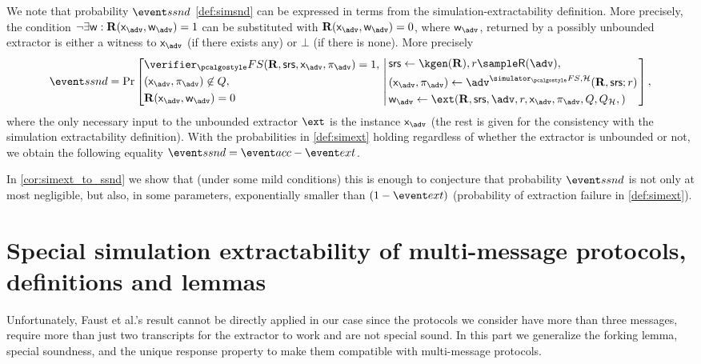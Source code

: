 \documentclass[runningheads,11pt]{llncs}
\begin{document}
\begin{remark}
  \label{rem:simext_to_simsnd}
  We note that probability $\ssndProb$ \cref{def:simsnd} can be expressed in
  terms from the simulation-extractability definition. More precisely, the
  condition $\neg \exists \wit: \REL(\inp_\adv, \wit_\adv) = 1$ can be substituted with
  $\REL(\inp_\adv, \wit_\adv) = 0$, where $\wit_\adv$, returned by a possibly unbounded
  extractor is either a witness to $\inp_\adv$ (if there exists any) or $\bot$ (if
  there is none). More precisely
\[
      \ssndProb =
      \Pr\left[
        \begin{aligned}
          & \verifier_\fs(\REL, \srs, \inp_{\adv}, \zkproof_{\adv}) = 1,\\
          & (\inp_{\advse}, \zkproof_{\advse}) \not\in Q,\\
          & \REL(\inp_{\adv}, \wit_{\adv}) = 0
        \end{aligned}
        \, \left| \,
      \begin{aligned}
        & \srs \gets \kgen(\REL), r \sample \RND{\advse},\\
        & (\inp_{\advse}, \zkproof_{\advse}) \gets \advse^{\simulator_\fs,
          \ro} (\REL, \srs; r)\\
        & \wit_{\adv} \gets \ext(\REL, \srs, \advse, r, \inp_{\advse}, \zkproof_{\advse},
			Q, Q_\ro,) 
      \end{aligned}
		\right.  \right],
\]
where the only necessary input to the unbounded extractor $\ext$ is the instance
$\inp_\adv$ (the rest is given for the consistency with the simulation extractability
definition). 
%
With the probabilities in \cref{def:simext} holding regardless of whether the extractor
is unbounded or not, we obtain the following equality
$ \ssndProb = \accProb - \extProb$.
\end{remark}

In \cref{cor:simext_to_ssnd} we show that (under some mild conditions) this is enough
to conjecture that probability $\ssndProb$ is not only at most negligible, but
also, in some parameters, exponentially smaller than $(1 - \extProb)$
(probability of extraction failure in \cref{def:simext}).

\section{Special simulation extractability of multi-message protocols,
  definitions and lemmas}
\label{sec:se_definitions}
Unfortunately, Faust et al.'s result cannot be directly applied in our case
since the protocols we consider have more than three messages, require more than
just two transcripts for the extractor to work and are not special
sound. In this part we generalize the forking lemma, special
soundness, and the unique response property to make them compatible with
multi-message protocols.
\end{document}

